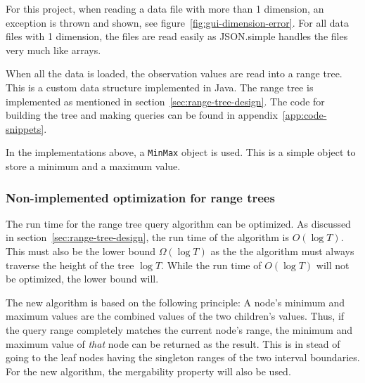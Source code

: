 For this project, when reading a data file with more than 1 dimension, an
exception is thrown and shown, see figure~\ref{fig:gui-dimension-error}.
For all data files with 1 dimension, the files are read
easily as JSON.simple handles the files very much like arrays. 

When all the data is loaded, the observation values are read into a range tree.
This is a custom data structure implemented in Java. The range tree is
implemented as mentioned in section~\ref{sec:range-tree-design}. The code for
building the tree and making queries can be found in
appendix~\ref{app:code-snippets}. 

In the implementations above, a \texttt{MinMax} object is used. This is a simple
object to store a minimum and a maximum value. 

\subsubsection{Non-implemented optimization for range trees}

The run time for the range tree query algorithm can be optimized. As discussed
in section~\ref{sec:range-tree-design}, the run time of the algorithm is $O(\log
T)$. This must also be the lower bound $\Omega(\log T)$ as the the algorithm
must always traverse the height of the tree $\log T$. While the run time of
$O(\log T)$ will not be optimized, the lower bound will. 

The new algorithm is based on the following principle: A node's minimum and
maximum values are the combined values of the two children's values. Thus, if
the query range completely matches the current node's range, the minimum and
maximum value of \textit{that} node can be returned as the result. This is in
stead of going to the leaf nodes having the singleton ranges of the two interval
boundaries. For the new algorithm, the mergability property will also be used. 

